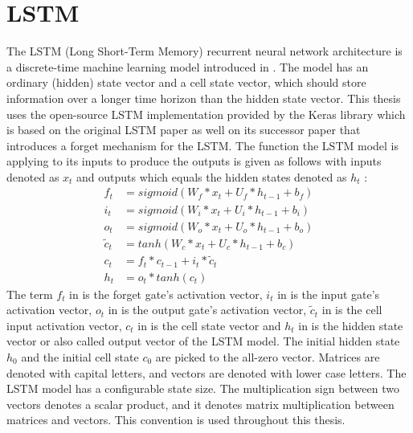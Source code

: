 \documentclass[draft,final]{vutinfth} %
\begin{document}
    \section{LSTM} \label{lstm}
    The LSTM (Long Short-Term Memory) recurrent neural network architecture is a discrete-time machine learning model introduced in .
    The model has an ordinary (hidden) state vector and a cell state vector, which should store information over a longer time horizon than the hidden state vector.
    This thesis uses the open-source LSTM implementation provided by the Keras library \cite{Keras} which is based on the original LSTM paper \cite{LSTM} as well on its successor paper \cite{LSTM_forget} that introduces a forget mechanism for the LSTM.
    The function the LSTM model is applying to its inputs to produce the outputs is given as follows with inputs denoted as $x_t$ and outputs which equals the hidden states denoted as $h_t$ \cite[p. 4-8]{LSTM_forget}:
    \begin{align}
        \label{forget_gate} f_t &= sigmoid(W_f*x_t + U_f*h_{t-1} + b_f) \\
        \label{input_gate} i_t &= sigmoid(W_i*x_t + U_i*h_{t-1} + b_i) \\
        \label{output_gate} o_t &= sigmoid(W_o*x_t + U_o*h_{t-1} + b_o) \\
        \label{cell_input} \tilde{c}_t &= tanh(W_c*x_t + U_c*h_{t-1} + b_c) \\
        \label{cell_state} c_t &= f_t * c_{t-1} + i_t * \tilde{c}_t \\
        \label{hidden_state} h_t &= o_t * tanh(c_t)
    \end{align}
    The term $f_t$ in  is the forget gate's activation vector, $i_t$ in  is the input gate's activation vector, $o_t$ in  is the output gate's activation vector, $\tilde{c}_t$ in  is the cell input activation vector, $c_t$ in  is the cell state vector and $h_t$ in  is the hidden state vector or also called output vector of the LSTM model.
    The initial hidden state $h_0$ and the initial cell state $c_0$ are picked to the all-zero vector.
    Matrices are denoted with capital letters, and vectors are denoted with lower case letters.
    The LSTM model has a configurable state size. The multiplication sign between two vectors denotes a scalar product, and it denotes matrix multiplication between matrices and vectors.
    This convention is used throughout this thesis.
\end{document}
